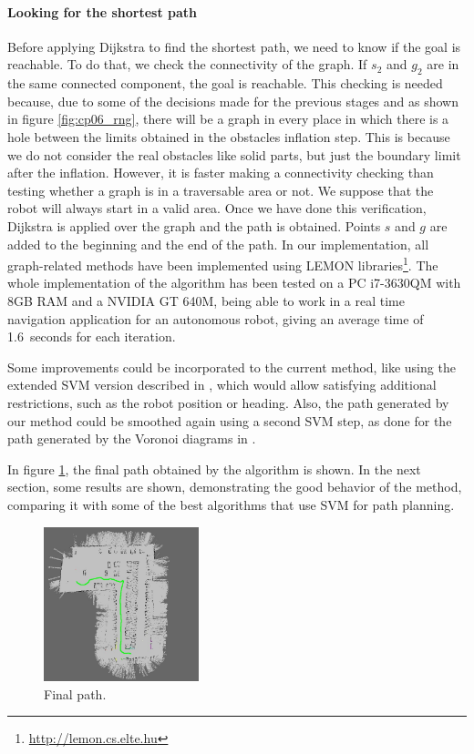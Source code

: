 \paragraph{Looking for the shortest path}\label{ch:chapter06_01_02_04_02}

Before applying Dijkstra to find the shortest path, we need to know if the goal is reachable. To do that, we check the connectivity of the graph. If $s_2$ and $g_2$ are in the same connected component, the goal is reachable. This checking is needed because, due to some of the decisions made for the previous stages and as shown in figure \ref{fig:cp06_rng}, there will be a graph in every place in which there is a hole between the limits obtained in the obstacles inflation step. This is because we do not consider the real obstacles like solid parts, but just the boundary limit after the inflation. However, it is faster making a connectivity checking than testing whether a graph is in a traversable area or not. We suppose that the robot will always start in a valid area.
Once we have done this verification, Dijkstra is applied over the graph and the path is obtained. Points $s$ and $g$ are added to the beginning and the end of the path. In our implementation, all graph-related methods have been implemented using LEMON libraries\footnote{\url{http://lemon.cs.elte.hu}}. The whole implementation of the algorithm has been tested on a PC i7-3630QM with 8GB RAM and a NVIDIA GT 640M, being able to work in a real time navigation application for an autonomous robot, giving an average time of 1.6\ seconds for each iteration.

Some improvements could be incorporated to the current method, like using the extended \ac{SVM} version described in \cite{qingyang2012local}, which would allow satisfying additional restrictions, such as the robot position or heading. Also, the path generated by our method could be smoothed again using a second \ac{SVM} step, as done for the path generated by the Voronoi diagrams in \cite{yang2012safe}.

In figure \ref{fig:cp06_final_path}, the final path obtained by the algorithm is shown. In the next section, some results are shown, demonstrating the good behavior of the method, comparing it with some of the best algorithms that use \ac{SVM} for path planning.

\begin{figure}[h!]
  \centering
  \includegraphics[width=0.4\textwidth, trim=0 0 0 0,clip]{figure7}
  \caption{Final path.}
  \label{fig:cp06_final_path}
\end{figure}

